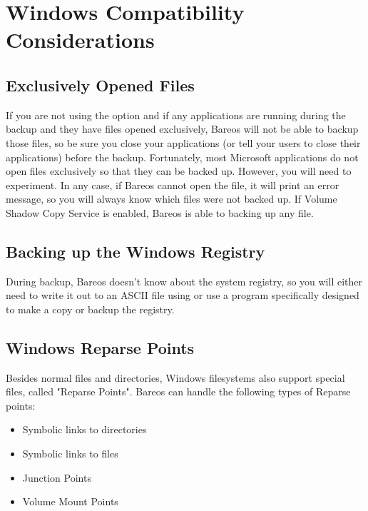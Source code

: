 \section{Windows Compatibility Considerations}
\label{Compatibility}

\subsection{Exclusively Opened Files}
If you are not using the  option and if any applications are running during
the backup and they have files opened exclusively, Bareos will not be able
to backup those files, so be sure you close your applications (or tell your
users to close their applications) before the backup.  Fortunately, most
Microsoft applications do not open files exclusively so that they can be
backed up.  However, you will need to experiment.  In any case, if Bareos
cannot open the file, it will print an error message, so you will always
know which files were not backed up.
If Volume Shadow Copy Service is enabled, Bareos is able to backing up any
file.

\subsection{Backing up the Windows Registry}
During backup, Bareos doesn't know about the system registry, so you will
either need to write it out to an ASCII file using  or use a
program specifically designed to make a copy or backup the registry.


\subsection{Windows Reparse Points}


Besides normal files and directories, Windows filesystems also support special files, called "Reparse Points".
Bareos can handle the following types of Reparse points:
\begin{itemize}
    \item Symbolic links to directories
    \item Symbolic links to files
    \item Junction Points
    \item Volume Mount Points
\end{itemize}

